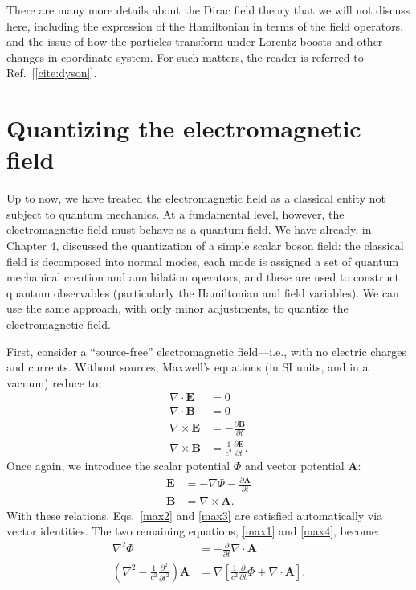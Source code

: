 \documentclass[prx,12pt]{revtex4-2}
\begin{document}
There are many more details about the Dirac field theory that we will
not discuss here, including the expression of the Hamiltonian in terms
of the field operators, and the issue of how the particles transform
under Lorentz boosts and other changes in coordinate system.  For such
matters, the reader is referred to Ref.~[\ref{cite:dyson}].

\section{Quantizing the electromagnetic field}
\label{sec:em_quantization}

Up to now, we have treated the electromagnetic field as a classical
entity not subject to quantum mechanics.  At a fundamental level,
however, the electromagnetic field must behave as a quantum field.  We
have already, in Chapter 4, discussed the quantization of a simple
scalar boson field: the classical field is decomposed into normal
modes, each mode is assigned a set of quantum mechanical creation and
annihilation operators, and these are used to construct quantum
observables (particularly the Hamiltonian and field variables).  We
can use the same approach, with only minor adjustments, to quantize
the electromagnetic field.

First, consider a ``source-free'' electromagnetic field---i.e., with
no electric charges and currents.  Without sources, Maxwell's
equations (in SI units, and in a vacuum) reduce to:
\begin{align}
  \nabla\cdot \mathbf{E} &= 0 \label{max1} \\
  \nabla\cdot \mathbf{B} &= 0 \label{max2}\\
  \nabla\times \mathbf{E} &= -\frac{\partial \mathbf{B}}{\partial t} \label{max3}\\
  \nabla\times \mathbf{B} &= \frac{1}{c^2} \frac{\partial \mathbf{E}}{\partial t}.
  \label{max4}
\end{align}
Once again, we introduce the scalar potential $\Phi$ and vector
potential $\mathbf{A}$:
\begin{align}
  \mathbf{E} &= - \nabla \Phi - \frac{\partial\mathbf{A}}{\partial t}
  \label{Efield} \\
  \mathbf{B} &= \nabla \times \mathbf{A}.
  \label{Bfield}
\end{align}
With these relations, Eqs.~\eqref{max2} and \eqref{max3} are satisfied
automatically via vector identities.  The two remaining equations,
\eqref{max1} and \eqref{max4}, become:
\begin{align}
  \nabla^2 \Phi &= -\frac{\partial}{\partial t} \nabla \cdot \mathbf{A} \label{max5} \\
  \left(\nabla^2 - \frac{1}{c^2}\frac{\partial^2}{\partial t^2}\right)
  \mathbf{A} &= \nabla\left[\frac{1}{c^2}\frac{\partial}{\partial t}  \Phi + \nabla\cdot\mathbf{A}\right]. \label{max6}
\end{align}
\end{document}
